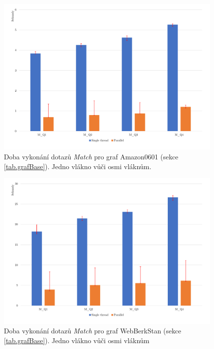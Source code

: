 \begin{figure}[!htp]
\includegraphics[width=\linewidth]{../img/amazonMatch.pdf}\centering
\caption{Doba vykonání dotazů \textit{Match} pro graf Amazon0601 (sekce \ref{tab.grafBase}). Jedno vlákno vůči osmi vláknům.}
\label{figure.amazonMatch}
\end{figure}

\begin{figure}[!htp]
\includegraphics[width=\linewidth]{../img/webberkstanMatch.pdf}\centering
\caption{Doba vykonání dotazů \textit{Match} pro graf WebBerkStan (sekce \ref{tab.grafBase}). Jedno vlákno vůči osmi vláknům}
\label{figure.webberkstanMatch}
\end{figure}

